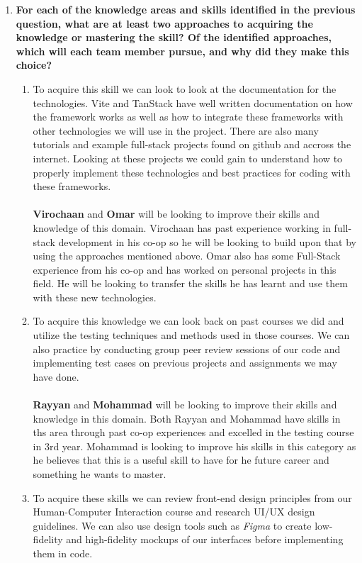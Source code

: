 \begin{enumerate}
\begin{enumerate}
  \end{enumerate}
  \item \textbf{For each of the knowledge areas and skills identified in the previous question, what are at least two approaches to acquiring the knowledge or mastering the skill?  Of the identified approaches, which will each team member pursue, and why did they make this choice?} \\
  \begin{enumerate}
    \item To acquire this skill we can look to look at the documentation for the technologies. Vite and TanStack have well written documentation on how the framework works as well as how to integrate these frameworks with other technologies we will use in the project. There are also many tutorials and example full-stack projects found on github and accross the internet. Looking at these projects we could gain to understand how to properly implement these technologies and best practices for coding with these frameworks. \\
    \\
    \textbf{Virochaan} and \textbf{Omar} will be looking to improve their skills and knowledge of this domain. Virochaan has past experience working in full-stack development in his co-op so he will be looking to build upon that by using the approaches mentioned above. Omar also has some Full-Stack experience from his co-op and has worked on personal projects in this field. He will be looking to transfer the skills he has learnt and use them with these new technologies.\\
    \item To acquire this knowledge we can look back on past courses we did and utilize the testing techniques and methods used in those courses. We can also practice by conducting group peer review sessions of our code and implementing test cases on previous projects and assignments we may have done. \\
    \\
    \textbf{Rayyan} and \textbf{Mohammad} will be looking to improve their skills and knowledge in this domain. Both Rayyan and Mohammad have skills in ths area through past co-op experiences and excelled in the testing course in 3rd year. Mohammad is looking to improve his skills in this category as he believes that this is a useful skill to have for he future career and something he wants to master.\\
    \item To acquire these skills we can review front-end design principles from our Human-Computer Interaction course and research UI/UX design guidelines. We can also use design tools such as \textit{Figma} to create low-fidelity and high-fidelity mockups of our interfaces before implementing them in code. \\

\end{enumerate}
\end{enumerate}
